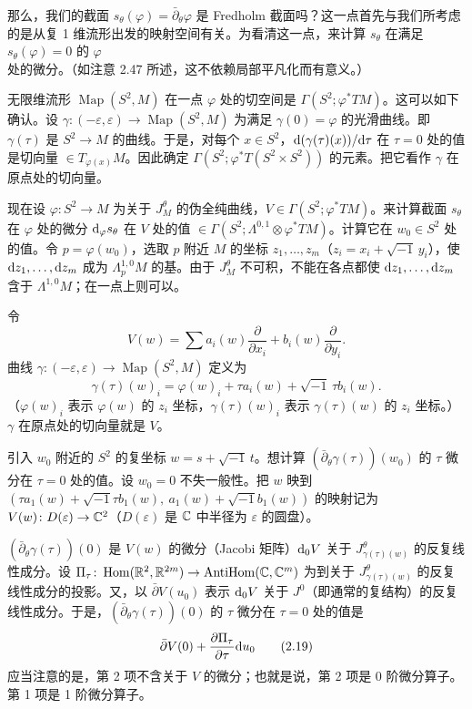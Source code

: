 那么，我们的截面 $s_\theta(\varphi)=\bar\partial_\theta\varphi$ 是 Fredholm 截面吗？这一点首先与我们所考虑的是从复 1 维流形出发的映射空间有关。为看清这一点，来计算 $s_\theta$ 在满足 $s_\theta(\varphi)=0$ 的 $\varphi$ 处的微分。（如注意 2.47 所述，这不依赖局部平凡化而有意义。）

无限维流形 $\operatorname{Map}(S^2,M)$ 在一点 $\varphi$ 处的切空间是 $\Gamma(S^2;\varphi^*TM)$。这可以如下确认。设 $\gamma\colon(-\varepsilon,\varepsilon)\to\operatorname{Map}(S^2,M)$ 为满足 $\gamma(0)=\varphi$ 的光滑曲线。即 $\gamma(\tau)$ 是 $S^2\to M$ 的曲线。于是，对每个 $x\in S^2$，$\mathrm{d}(\gamma(\tau)(x))/\mathrm{d}\tau$ 在 $\tau=0$ 处的值是切向量 $\in T_{\varphi(x)}M$。因此确定 $\Gamma(S^2;\varphi^*T(S^2\times S^2))$ 的元素。把它看作 $\gamma$ 在原点处的切向量。

现在设 $\varphi\colon S^2\to M$ 为关于 $J^\theta_M$ 的伪全纯曲线，$V\in\Gamma(S^2;\varphi^*TM)$。来计算截面 $s_\theta$ 在 $\varphi$ 处的微分 $\mathrm{d}_\varphi s_\theta$ 在 $V$ 处的值 $\in\Gamma(S^2;\Lambda^{0,1}\otimes\varphi^*TM)$。计算它在 $w_0\in S^2$ 处的值。令 $p=\varphi(w_0)$，选取 $p$ 附近 $M$ 的坐标 $z_1,\dots,z_m$（$z_i=x_i+\sqrt{-1}\,y_i$），使 $\mathrm{d} z_1,\dots,\mathrm{d} z_m$ 成为 $\Lambda_p^{1,0}M$ 的基。由于 $J^\theta_M$ 不可积，不能在各点都使 $\mathrm{d} z_1,\dots,\mathrm{d} z_m$ 含于 $\Lambda^{1,0}M$；在一点上则可以。

令
\[
  V(w)=\sum a_i(w)\frac{\partial}{\partial x_i}+b_i(w)\frac{\partial}{\partial y_i}.
\]
曲线 $\gamma\colon(-\varepsilon,\varepsilon)\to\operatorname{Map}(S^2,M)$ 定义为
\[
  \gamma(\tau)(w)_i=\varphi(w)_i+\tau a_i(w)+\sqrt{-1}\,\tau b_i(w).
\]
（$\varphi(w)_i$ 表示 $\varphi(w)$ 的 $z_i$ 坐标，$\gamma(\tau)(w)_i$ 表示 $\gamma(\tau)(w)$ 的 $z_i$ 坐标。）$\gamma$ 在原点处的切向量就是 $V$。

引入 $w_0$ 附近的 $S^2$ 的复坐标 $w=s+\sqrt{-1}\,t$。想计算 $(\bar\partial_\theta\gamma(\tau))(w_0)$ 的 $\tau$ 微分在 $\tau=0$ 处的值。设 $w_0=0$ 不失一般性。把 $w$ 映到 $(\tau a_1(w)+\sqrt{-1}\tau b_1(w),\ a_1(w)+\sqrt{-1}b_1(w))$ 的映射记为 $V(w)\colon D(\varepsilon)\to\mathbb{C}^2$（$D(\varepsilon)$ 是 $\mathbb{C}$ 中半径为 $\varepsilon$ 的圆盘）。

$(\bar\partial_\theta\gamma(\tau))(0)$ 是 $V(w)$ 的微分（Jacobi 矩阵）$\mathrm{d}_0V$ 关于 $J^\theta_{\gamma(\tau)(w)}$ 的反复线性成分。设 $\Pi_\tau\colon\operatorname{Hom}(\mathbb{R}^2,\mathbb{R}^{2m})\to\operatorname{AntiHom}(\mathbb{C},\mathbb{C}^m)$ 为到关于 $J^\theta_{\gamma(\tau)(w)}$ 的反复线性成分的投影。又，以 $\bar\partial V(u_0)$ 表示 $\mathrm{d}_0V$ 关于 $J^0$（即通常的复结构）的反复线性成分。于是，$(\bar\partial_\theta\gamma(\tau))(0)$ 的 $\tau$ 微分在 $\tau=0$ 处的值是
\begin{equation}
  \bar\partial V(0)+\frac{\partial\Pi_\tau}{\partial\tau}\mathrm{d} u_0 \tag{2.19}
\end{equation}
应当注意的是，第 2 项不含关于 $V$ 的微分；也就是说，第 2 项是 0 阶微分算子。第 1 项是 1 阶微分算子。


